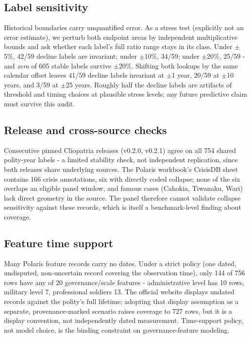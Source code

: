 \documentclass[conference]{IEEEtran}
\begin{document}
\subsection{Label sensitivity}
Historical boundaries carry unquantified error. As a stress test (explicitly not
an error estimate), we perturb both endpoint areas by independent multiplicative
bounds and ask whether each label's full ratio range stays in its class. Under
$\pm$5\%, 42/59 decline labels are invariant; under $\pm$10\%, 34/59; under
$\pm$20\%, 25/59 - and \emph{zero} of 605 stable labels survive $\pm$20\%.
Shifting both lookups by the same calendar offset leaves 41/59 decline labels
invariant at $\pm$1 year, 20/59 at $\pm$10 years, and 3/59 at $\pm$25 years.
Roughly half the decline labels are artifacts of threshold and timing choices at
plausible stress levels; any future predictive claim must survive this audit.

\subsection{Release and cross-source checks}
Consecutive pinned Cliopatria releases (v0.2.0, v0.2.1) agree on all 754 shared
polity-year labels - a limited stability check, not independent replication, since
both releases share underlying sources. The Polaris workbook's CrisisDB sheet
contains 166 crisis annotations, six with directly coded collapse; none of the six
overlaps an eligible panel window, and famous cases (Cahokia, Tiwanaku, Wari) lack
direct geometry in the source. The panel therefore cannot validate collapse
sensitivity against these records, which is itself a benchmark-level finding about
coverage.

\subsection{Feature time support}
Many Polaris feature records carry no dates. Under a strict policy (one dated,
undisputed, non-uncertain record covering the observation time), only 144 of 756
rows have any of 20 governance/scale features - administrative level has 10 rows,
military level 7, professional soldiers 13. The official website displays undated
records against the polity's full lifetime; adopting that display assumption as a
separate, provenance-marked scenario raises coverage to 727 rows, but it is a
display convention, not independently dated measurement. Time-support policy, not
model choice, is the binding constraint on governance-feature modeling.
\end{document}
